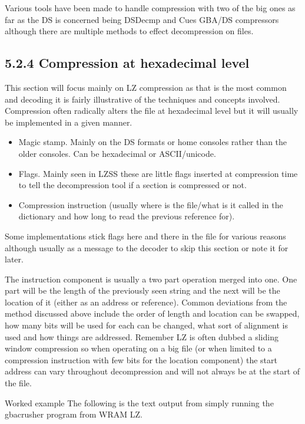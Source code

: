 \documentclass[
]{book}
\providecommand{\tightlist}{%
  \setlength{\itemsep}{0pt}\setlength{\parskip}{0pt}}
\begin{document}
Various tools have been made to handle compression with two of the big ones as far as the DS is concerned being DSDecmp and Cues GBA/DS compressors although there are multiple methods to effect decompression on files.

\hypertarget{compression-at-hexadecimal-level}{%
\subsection{5.2.4 Compression at hexadecimal level}\label{compression-at-hexadecimal-level}}

This section will focus mainly on LZ compression as that is the most common and decoding it is fairly illustrative of the techniques and concepts involved. Compression often radically alters the file at hexadecimal level but it will usually be implemented in a given manner.

\begin{itemize}
\tightlist
\item
  Magic stamp. Mainly on the DS formats or home consoles rather than the older consoles. Can be hexadecimal or ASCII/unicode.
\item
  Flags. Mainly seen in LZSS these are little flags inserted at compression time to tell the decompression tool if a section is compressed or not.
\item
  Compression instruction (usually where is the file/what is it called in the dictionary and how long to read the previous reference for).
\end{itemize}

Some implementations stick flags here and there in the file for various reasons although usually as a message to the decoder to skip this section or note it for later.

The instruction component is usually a two part operation merged into one. One part will be the length of the previously seen string and the next will be the location of it (either as an address or reference). Common deviations from the method discussed above include the order of length and location can be swapped, how many bits will be used for each can be changed, what sort of alignment is used and how things are addressed. Remember LZ is often dubbed a sliding window compression so when operating on a big file (or when limited to a compression instruction with few bits for the location component) the start address can vary throughout decompression and will not always be at the start of the file.

Worked example The following is the text output from simply running the gbacrusher program from WRAM LZ.
\end{document}
